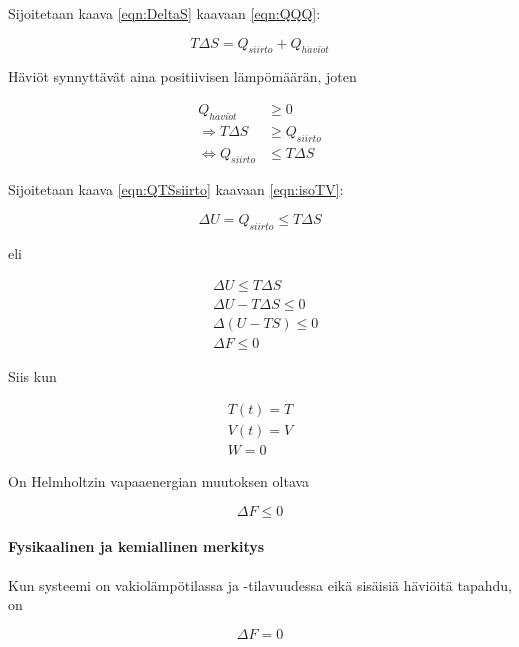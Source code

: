 \documentclass[12pt,a4paper,finnish]{book}
\begin{document}
Sijoitetaan kaava \ref{eqn:DeltaS} kaavaan \ref{eqn:QQQ}:

\begin{equation}
 T\Delta S = Q_{siirto} + Q_{h\ddot{a}vi\ddot{o}t}
\end{equation}

Häviöt synnyttävät aina positiivisen lämpömäärän, joten

\begin{align}
 Q_{h\ddot{a}vi\ddot{o}t} & \geq 0\\
 \Rightarrow T\Delta S & \geq Q_{siirto}\\
 \label{eqn:QTSsiirto}
 \Leftrightarrow Q_{siirto} & \leq T \Delta S
\end{align}

Sijoitetaan kaava \ref{eqn:QTSsiirto} kaavaan \ref{eqn:isoTV}:

\begin{equation}
 \Delta U = Q_{siirto} \leq T\Delta S
\end{equation}

eli 

\begin{align}
 & \Delta U \leq T\Delta S\\
 & \Delta U - T\Delta S \leq 0\\
 & \Delta(U - TS) \leq 0\\
 & \Delta F \leq 0
\end{align}

Siis kun

\begin{align}
 T(t) = T\\
 V(t) = V\\
 W = 0
\end{align}

On Helmholtzin vapaaenergian muutoksen oltava

\begin{equation}
 \Delta F \leq 0
\end{equation}

\paragraph{Fysikaalinen ja kemiallinen merkitys}

Kun systeemi on vakiolämpötilassa ja -tilavuudessa eikä sisäisiä häviöitä tapahdu, on 

\begin{equation}
 \Delta F = 0
\end{equation}
\end{document}
